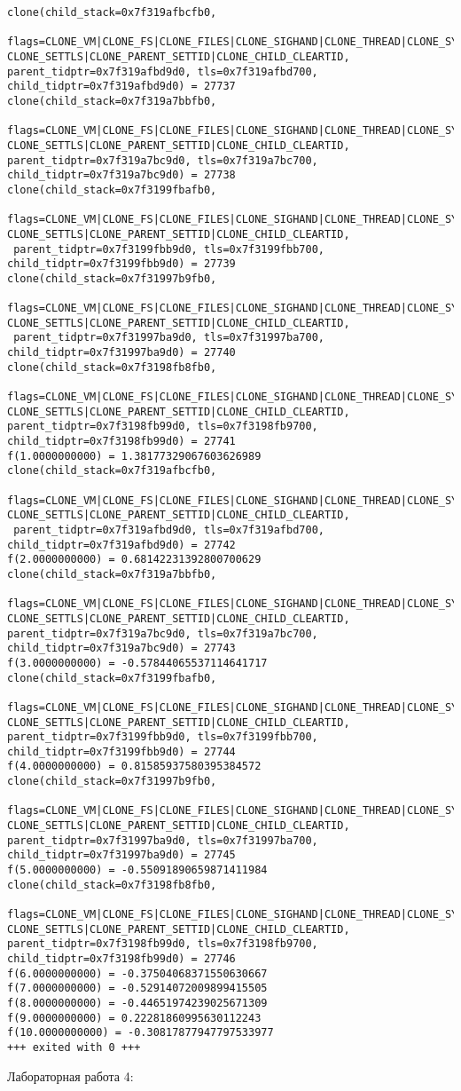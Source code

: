 \documentclass[12pt]{article}
\begin{document}
{{\begin{lstlisting}[escapechar=!]
clone(child_stack=0x7f319afbcfb0,
 flags=CLONE_VM|CLONE_FS|CLONE_FILES|CLONE_SIGHAND|CLONE_THREAD|CLONE_SYSVSEM|
CLONE_SETTLS|CLONE_PARENT_SETTID|CLONE_CHILD_CLEARTID, 
parent_tidptr=0x7f319afbd9d0, tls=0x7f319afbd700, child_tidptr=0x7f319afbd9d0) = 27737
clone(child_stack=0x7f319a7bbfb0,
 flags=CLONE_VM|CLONE_FS|CLONE_FILES|CLONE_SIGHAND|CLONE_THREAD|CLONE_SYSVSEM|
CLONE_SETTLS|CLONE_PARENT_SETTID|CLONE_CHILD_CLEARTID, 
parent_tidptr=0x7f319a7bc9d0, tls=0x7f319a7bc700, child_tidptr=0x7f319a7bc9d0) = 27738
clone(child_stack=0x7f3199fbafb0,
 flags=CLONE_VM|CLONE_FS|CLONE_FILES|CLONE_SIGHAND|CLONE_THREAD|CLONE_SYSVSEM|
CLONE_SETTLS|CLONE_PARENT_SETTID|CLONE_CHILD_CLEARTID,
 parent_tidptr=0x7f3199fbb9d0, tls=0x7f3199fbb700, child_tidptr=0x7f3199fbb9d0) = 27739
clone(child_stack=0x7f31997b9fb0,
 flags=CLONE_VM|CLONE_FS|CLONE_FILES|CLONE_SIGHAND|CLONE_THREAD|CLONE_SYSVSEM|
CLONE_SETTLS|CLONE_PARENT_SETTID|CLONE_CHILD_CLEARTID,
 parent_tidptr=0x7f31997ba9d0, tls=0x7f31997ba700, child_tidptr=0x7f31997ba9d0) = 27740
clone(child_stack=0x7f3198fb8fb0,
 flags=CLONE_VM|CLONE_FS|CLONE_FILES|CLONE_SIGHAND|CLONE_THREAD|CLONE_SYSVSEM|
CLONE_SETTLS|CLONE_PARENT_SETTID|CLONE_CHILD_CLEARTID, 
parent_tidptr=0x7f3198fb99d0, tls=0x7f3198fb9700, child_tidptr=0x7f3198fb99d0) = 27741
f(1.0000000000) = 1.38177329067603626989
clone(child_stack=0x7f319afbcfb0,
 flags=CLONE_VM|CLONE_FS|CLONE_FILES|CLONE_SIGHAND|CLONE_THREAD|CLONE_SYSVSEM|
CLONE_SETTLS|CLONE_PARENT_SETTID|CLONE_CHILD_CLEARTID,
 parent_tidptr=0x7f319afbd9d0, tls=0x7f319afbd700, child_tidptr=0x7f319afbd9d0) = 27742
f(2.0000000000) = 0.68142231392800700629
clone(child_stack=0x7f319a7bbfb0,
 flags=CLONE_VM|CLONE_FS|CLONE_FILES|CLONE_SIGHAND|CLONE_THREAD|CLONE_SYSVSEM|
CLONE_SETTLS|CLONE_PARENT_SETTID|CLONE_CHILD_CLEARTID, 
parent_tidptr=0x7f319a7bc9d0, tls=0x7f319a7bc700, child_tidptr=0x7f319a7bc9d0) = 27743
f(3.0000000000) = -0.57844065537114641717
clone(child_stack=0x7f3199fbafb0,
 flags=CLONE_VM|CLONE_FS|CLONE_FILES|CLONE_SIGHAND|CLONE_THREAD|CLONE_SYSVSEM|
CLONE_SETTLS|CLONE_PARENT_SETTID|CLONE_CHILD_CLEARTID, 
parent_tidptr=0x7f3199fbb9d0, tls=0x7f3199fbb700, child_tidptr=0x7f3199fbb9d0) = 27744
f(4.0000000000) = 0.81585937580395384572
clone(child_stack=0x7f31997b9fb0,
 flags=CLONE_VM|CLONE_FS|CLONE_FILES|CLONE_SIGHAND|CLONE_THREAD|CLONE_SYSVSEM|
CLONE_SETTLS|CLONE_PARENT_SETTID|CLONE_CHILD_CLEARTID, 
parent_tidptr=0x7f31997ba9d0, tls=0x7f31997ba700, child_tidptr=0x7f31997ba9d0) = 27745
f(5.0000000000) = -0.55091890659871411984
clone(child_stack=0x7f3198fb8fb0,
 flags=CLONE_VM|CLONE_FS|CLONE_FILES|CLONE_SIGHAND|CLONE_THREAD|CLONE_SYSVSEM|
CLONE_SETTLS|CLONE_PARENT_SETTID|CLONE_CHILD_CLEARTID, 
parent_tidptr=0x7f3198fb99d0, tls=0x7f3198fb9700, child_tidptr=0x7f3198fb99d0) = 27746
f(6.0000000000) = -0.37504068371550630667
f(7.0000000000) = -0.52914072009899415505
f(8.0000000000) = -0.44651974239025671309
f(9.0000000000) = 0.22281860995630112243
f(10.0000000000) = -0.30817877947797533977
+++ exited with 0 +++
\end{lstlisting}
}Лабораторная работа 4:
{
\scriptsize

}}
\end{document}
